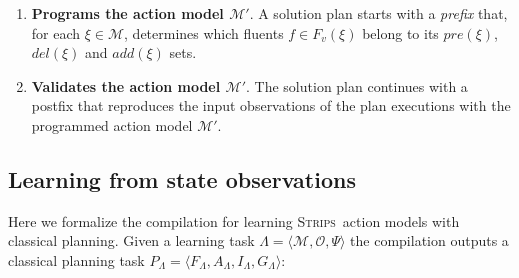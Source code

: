 \documentclass[3p,times]{elsarticle}
\newcommand{\strips}{\textsc{Strips}}     %
\newcommand{\tup}[1]{{\langle #1 \rangle}}
\begin{document}
\begin{enumerate}
\item {\bf Programs the action model $\mathcal{M}'$}. A solution plan starts with a {\em prefix} that, for each $\xi\in\mathcal{M}$, determines which fluents $f\in F_v(\xi)$ belong to its $pre(\xi)$, $del(\xi)$ and $add(\xi)$ sets.
\item {\bf Validates the action model $\mathcal{M}'$}. The solution plan continues with a postfix that reproduces the input observations of the plan executions with the programmed action model $\mathcal{M}'$.
\end{enumerate}


\subsection{Learning from state observations}
Here we formalize the compilation for learning \strips\ action models with classical planning. Given a learning task $\Lambda=\tup{\mathcal{M},\mathcal{O},\Psi}$ the compilation outputs a classical planning task $P_{\Lambda}=\tup{F_{\Lambda},A_{\Lambda},I_{\Lambda},G_{\Lambda}}$:
\end{document}
